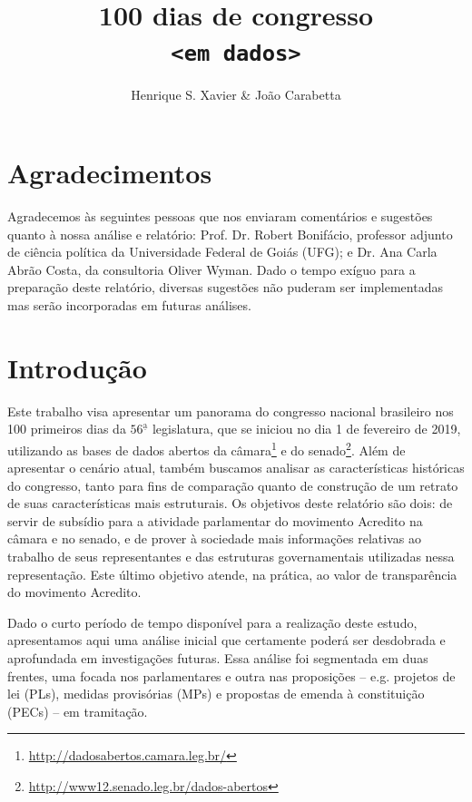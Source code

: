 \documentclass[12pt,a4paper]{article}
\author{Henrique S. Xavier \& João Carabetta}
\title{\secColor\Huge\sffamily\bfseries 100 dias de congresso\\\texttt{<em dados>}}
\affil{Gabinete compartilhado\\Movimento Acredito no Congresso Nacional}
\newcommand{\footurl}[1]{{\scriptsize\url{#1}}}
\begin{document}
\thispagestyle{empty}
\maketitle
\pagebreak

\thispagestyle{empty}
\tableofcontents
\pagebreak

\thispagestyle{plain}

\setcounter{secnumdepth}{0}
\section{Agradecimentos}

Agradecemos às seguintes pessoas que nos enviaram
comentários e sugestões quanto à nossa análise e relatório: Prof. Dr. Robert Bonifácio, professor adjunto de ciência política da Universidade Federal de Goiás (UFG); e Dr. Ana Carla Abrão Costa, da consultoria Oliver Wyman. Dado o tempo exíguo para a preparação deste relatório, diversas sugestões não puderam ser implementadas mas serão incorporadas em futuras análises.  


\setcounter{secnumdepth}{3}
\section{Introdução}
\label{sec:intro}

Este trabalho visa apresentar um panorama do congresso nacional brasileiro nos 100 primeiros dias da $56^{\mathrm{\underline{a}}}$ legislatura, que
se iniciou no dia 1 de fevereiro de 2019, utilizando as bases de dados abertos da câmara\footnote{\footurl{http://dadosabertos.camara.leg.br/}}
e do senado\footnote{\footurl{http://www12.senado.leg.br/dados-abertos}}. Além de apresentar o cenário atual, também buscamos analisar
as características históricas do congresso, tanto para fins de comparação quanto de construção de um retrato de suas características
mais estruturais. Os objetivos deste relatório são dois: de servir de subsídio para a atividade parlamentar do movimento Acredito na
câmara e no senado, e de prover à sociedade mais informações relativas ao trabalho de seus representantes e das estruturas governamentais
utilizadas nessa representação. Este último objetivo atende, na prática, ao valor de transparência do movimento Acredito.

Dado o curto período de tempo disponível para a realização deste estudo, apresentamos aqui uma análise inicial que
certamente poderá ser desdobrada e aprofundada em investigações futuras. Essa análise foi segmentada em duas frentes,
uma focada nos parlamentares e outra nas proposições -- e.g. projetos de lei (PLs), medidas provisórias (MPs) e propostas
de emenda à constituição (PECs) -- em tramitação.
\end{document}
